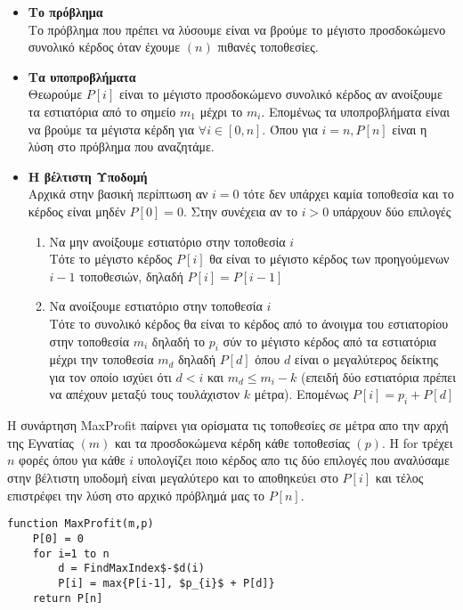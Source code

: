 \documentclass[a4paper,11pt]{article}
\begin{document}
\begin{itemize}
\item\textbf{Το πρόβλημα}\\
Το πρόβλημα που πρέπει να λύσουμε είναι να βρούμε το μέγιστο προσδοκώμενο συνολικό κέρδος όταν έχουμε $(n)$ πιθανές τοποθεσίες.
\item\textbf{Τα υποπροβλήματα}\\
Θεωρούμε $P[i]$ είναι το μέγιστο προσδοκώμενο συνολικό κέρδος αν ανοίξουμε τα εστιατόρια από το σημείο $m_{1}$ μέχρι το $m_{i}$. Επομένως τα υποπροβλήματα είναι να βρούμε τα μέγιστα κέρδη για $\forall i \in [0,n]$. Όπου για $i = n, P[n]$ είναι η λύση στο πρόβλημα που αναζητάμε.
\item\textbf{Η βέλτιστη Υποδομή}\\
Αρχικά στην βασική περίπτωση αν $i = 0$ τότε δεν υπάρχει καμία τοποθεσία και το κέρδος είναι μηδέν $P[0] = 0$.
Στην συνέχεια αν το $i>0$ υπάρχουν δύο επιλογές
\begin{enumerate}
\item Να μην ανοίξουμε εστιατόριο στην τοποθεσία $i$\\
Τότε το μέγιστο κέρδος $P[i]$ θα είναι το μέγιστο κέρδος των προηγούμενων $i-1$ τοποθεσιών, δηλαδή $P[i]=P[i-1]$
\item Να ανοίξουμε εστιατόριο στην τοποθεσία $i$\\
Τότε το συνολικό κέρδος θα είναι το κέρδος από το άνοιγμα του εστιατορίου στην τοποθεσία $m_{i}$ δηλαδή το  $p_{i}$ σύν το μέγιστο κέρδος από τα εστιατόρια μέχρι την τοποθεσία $m_{d}$ δηλαδή $P[d]$ όπου $d$ είναι ο μεγαλύτερος δείκτης για τον οποίο ισχύει ότι $d<i$ και $m_{d} \leq m_{i}-k$ (επειδή δύο εστιατόρια πρέπει να απέχουν μεταξύ τους τουλάχιστον $k$ μέτρα).
Επομένως $P[i] = p_{i} + P[d]$
\end{enumerate}
\end{itemize}

\vspace{1cm}

Η συνάρτηση MaxProfit παίρνει για ορίσματα τις τοποθεσίες σε μέτρα απο την αρχή της Εγνατίας $(m)$ και τα προσδοκώμενα κέρδη κάθε τοποθεσίας $(p)$. Η for τρέχει $n$ φορές όπου για κάθε $i$ υπολογίζει ποιο κέρδος απο τις δύο επιλογές που αναλύσαμε στην βέλτιστη υποδομή είναι μεγαλύτερο και το αποθηκεύει στο $P[i]$  και τέλος επιστρέφει την λύση στο αρχικό πρόβλημά μας το $P[n]$.

\begin{lstlisting}[mathescape]
function MaxProfit(m,p)
	P[0] = 0
	for i=1 to n
		d = FindMaxIndex$-$d(i)
		P[i] = max{P[i-1], $p_{i}$ + P[d]}
	return P[n]
\end{lstlisting}
\end{document}
